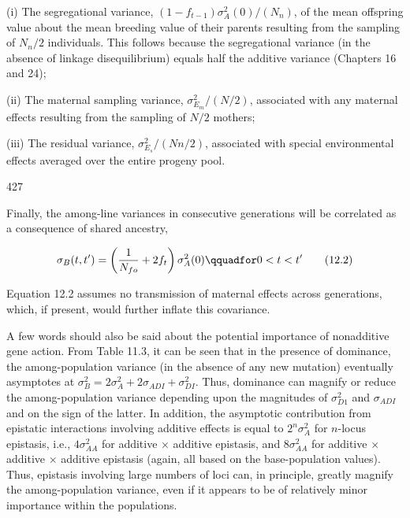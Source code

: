 \documentclass{article}
\begin{document}
(i) The segregational variance,  $ (1 - f_{t-1})\sigma_A^2(0)/(N_n) $, of the mean offspring value about the mean breeding value of their parents resulting from the sampling of  $ N_n/2 $ individuals. This follows because the segregational variance (in the absence of linkage disequilibrium) equals half the additive variance (Chapters 16 and 24);

(ii) The maternal sampling variance,  $ \sigma_{E_m}^2/(N/2) $, associated with any maternal effects resulting from the sampling of  $ N/2 $ mothers;

(iii) The residual variance,  $ \sigma_{E_{s}}^{2}/(Nn/2) $, associated with special environmental effects averaged over the entire progeny pool.

427

Finally, the among-line variances in consecutive generations will be correlated as a consequence of shared ancestry,

\begin{equation}
\sigma_{B}(t,t^{\prime})=\left(\frac{1}{N_{f o}}+2f_{t}\right)\sigma_{A}^{2}(0)\qquadfor0<t<t^{\prime}
\tag{12.2}
\label{eq:12_2}
\end{equation}

Equation 12.2 assumes no transmission of maternal effects across generations, which, if present, would further inflate this covariance.

A few words should also be said about the potential importance of nonadditive gene action. From Table 11.3, it can be seen that in the presence of dominance, the among-population variance (in the absence of any new mutation) eventually asymptotes at  $ \sigma_{B}^{2} = 2\sigma_{A}^{2} + 2\sigma_{ADI} + \sigma_{DI}^{2} $. Thus, dominance can magnify or reduce the among-population variance depending upon the magnitudes of  $ \sigma_{D1}^{2} $ and  $ \sigma_{ADI} $ and on the sign of the latter. In addition, the asymptotic contribution from epistatic interactions involving additive effects is equal to  $ 2^{n}\sigma_{A}^{2} $ for  $ n $-locus epistasis, i.e.,  $ 4\sigma_{AA}^{2} $ for additive × additive epistasis, and  $ 8\sigma_{AA}^{2} $ for additive × additive × additive epistasis (again, all based on the base-population values). Thus, epistasis involving large numbers of loci can, in principle, greatly magnify the among-population variance, even if it appears to be of relatively minor importance within the populations.
\end{document}
